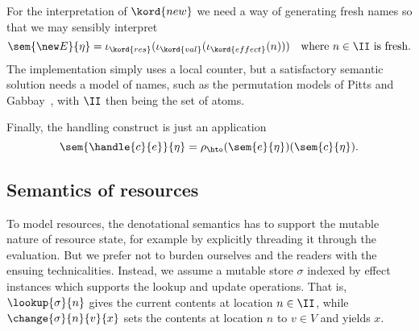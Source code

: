 %
For the interpretation of $\kord{new}$ we need a way of generating fresh names so that we
may sensibly interpret
%
\begin{equation*}
  \sem{\new E}{\eta} = \iota_{\kord{res}}(\iota_\kord{val}(\iota_{\kord{effect}}(n)))
  \quad \text{where $n \in \II$ is fresh.}
\end{equation*}
%
The implementation simply uses a local counter, but a satisfactory semantic solution needs
a model of names, such as the permutation models of Pitts and
Gabbay~\cite{gabbay01a-new-approach}, with $\II$ then being the set of atoms.

Finally, the handling construct is just an application
%
\begin{equation*}
  \sem{\handle{c}{e}}{\eta} = \rho_{\hto}(\sem{e}{\eta}) (\sem{c}{\eta}).
\end{equation*}


\subsection{Semantics of resources}
\label{sec:semantics-resources}

To model resources, the denotational semantics has to support the mutable nature of resource state, for example by explicitly threading it through the evaluation.
But we prefer not to burden ourselves and the readers with the ensuing technicalities.
Instead, we assume a mutable store $\sigma$ indexed by effect instances which supports the lookup and update operations.
That is, $\lookup{\sigma}{n}$ gives the current contents at location $n \in \II$, while
$\change{\sigma}{n}{v}{x}$ sets the contents at location $n$ to $v \in V$ and yields $x$.


